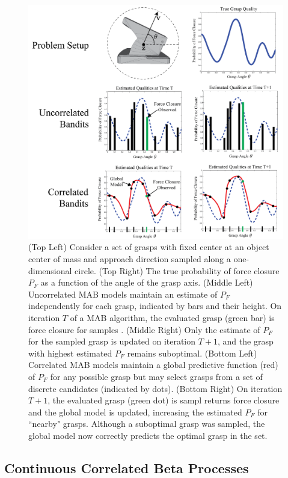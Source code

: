 \begin{figure}[t!]
\centering
\includegraphics[scale=0.23]{figures/illustrations/correlated_bandits.png}
\caption{(Top Left) Consider a set of grasps with fixed center at an object center of mass and approach direction sampled along a one-dimensional circle. (Top Right) The true probability of force closure $P_F$ as a function of the angle of the grasp axis. (Middle Left) Uncorrelated MAB models maintain an estimate of $P_F$ independently for each grasp, indicated by bars and their height. On iteration $T$ of a MAB algorithm, the evaluated grasp (green bar) is force closure for samples . (Middle Right) Only the estimate of $P_F$ for the sampled grasp is updated on iteration $T+1$, and the grasp with highest estimated $P_F$ remains suboptimal. (Bottom Left) Correlated MAB models maintain a global predictive function (red) of $P_F$ for any possible grasp but may select grasps from a set of discrete candidates (indicated by dots). (Bottom Right) On iteration $T+1$, the evaluated grasp (green dot) is sampl returns force closure and the global model is updated, increasing the estimated $P_F$ for ``nearby" grasps. Although a suboptimal grasp was sampled, the global model now correctly predicts the optimal grasp in the set. }
\vspace*{-15pt}
\end{figure}

\subsection{Continuous Correlated Beta Processes}

